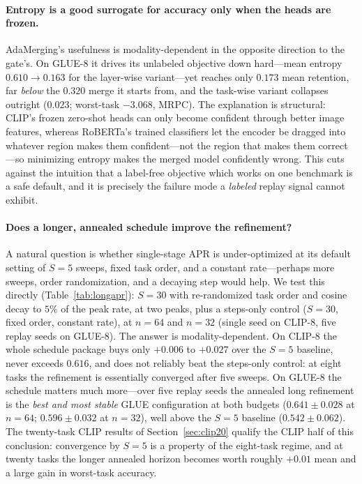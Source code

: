 \documentclass[11pt]{article}
\begin{document}
\paragraph{Entropy is a good surrogate for accuracy only when the heads are frozen.}
AdaMerging's usefulness is modality-dependent in the opposite direction to the gate's. On GLUE-8 it drives its unlabeled objective down hard---mean entropy $0.610\to0.163$ for the layer-wise variant---yet reaches only $0.173$ mean retention, far \emph{below} the $0.320$ merge it starts from, and the task-wise variant collapses outright ($0.023$; worst-task $-3.068$, MRPC). The explanation is structural: CLIP's frozen zero-shot heads can only become confident through better image features, whereas RoBERTa's trained classifiers let the encoder be dragged into whatever region makes them confident---not the region that makes them correct---so minimizing entropy makes the merged model confidently wrong. This cuts against the intuition that a label-free objective which works on one benchmark is a safe default, and it is precisely the failure mode a \emph{labeled} replay signal cannot exhibit.

\paragraph{Does a longer, annealed schedule improve the refinement?}
A natural question is whether single-stage APR is under-optimized at its default setting of $S=5$ sweeps, fixed task order, and a constant rate---perhaps more sweeps, order randomization, and a decaying step would help. We test this directly (Table~\ref{tab:longapr}): $S=30$ with re-randomized task order and cosine decay to $5\%$ of the peak rate, at two peaks, plus a steps-only control ($S=30$, fixed order, constant rate), at $n=64$ and $n=32$ (single seed on CLIP-8, five replay seeds on GLUE-8). The answer is modality-dependent. On CLIP-8 the whole schedule package buys only $+0.006$ to $+0.027$ over the $S=5$ baseline, never exceeds $0.616$, and does not reliably beat the steps-only control: at eight tasks the refinement is essentially converged after five sweeps. On GLUE-8 the schedule matters much more---over five replay seeds the annealed long refinement is the \emph{best and most stable} GLUE configuration at both budgets ($0.641\pm0.028$ at $n=64$; $0.596\pm0.032$ at $n=32$), well above the $S=5$ baseline ($0.542\pm0.062$). The twenty-task CLIP results of Section~\ref{sec:clip20} qualify the CLIP half of this conclusion: convergence by $S=5$ is a property of the eight-task regime, and at twenty tasks the longer annealed horizon becomes worth roughly $+0.01$ mean and a large gain in worst-task accuracy.
\end{document}
